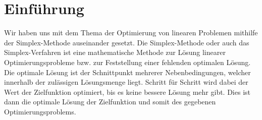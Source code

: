 \section{Einführung}

Wir haben uns mit dem Thema der Optimierung von linearen Problemen mithilfe der Simplex-Methode auseinander gesetzt.
Die Simplex-Methode oder auch das Simplex-Verfahren ist eine mathematische Methode zur Lösung linearer Optimierungsprobleme bzw. zur Feststellung einer fehlenden optimalen Lösung. Die optimale Lösung ist der Schnittpunkt mehrerer Nebenbedingungen, welcher innerhalb der zulässigen Lösungsmenge liegt.
Schritt für Schritt wird dabei der Wert der Zielfunktion optimiert, bis es keine bessere Lösung mehr gibt. Dies ist dann die optimale Lösung der Zielfunktion und somit des gegebenen Optimierungsproblems.

